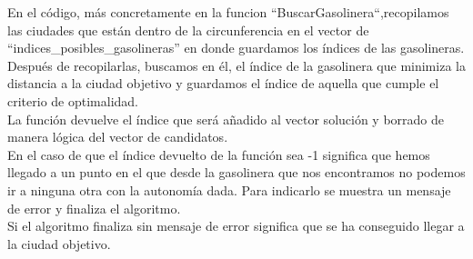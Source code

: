 \documentclass[11pt,a4paper]{article} %
\begin{document}
En el código, más concretamente en la funcion “BuscarGasolinera“,recopilamos las ciudades que están dentro de la circunferencia en el vector de “indices\_posibles\_gasolineras” en donde guardamos los índices de las gasolineras.\\

Después de recopilarlas, buscamos en él, el índice de la gasolinera que minimiza la distancia a la ciudad objetivo y guardamos el índice de aquella que cumple el criterio de optimalidad.\\

La función devuelve el índice que será añadido al vector solución y borrado de manera lógica del vector de candidatos.\\

En el caso de que el índice devuelto de la función sea -1 significa que hemos llegado a un punto en el que desde la gasolinera que nos encontramos no podemos ir a ninguna otra con la autonomía dada. Para indicarlo se muestra un mensaje de error y finaliza el algoritmo.\\

Si el algoritmo finaliza sin mensaje de error significa que se ha conseguido llegar a la ciudad objetivo.\\
\end{document}
